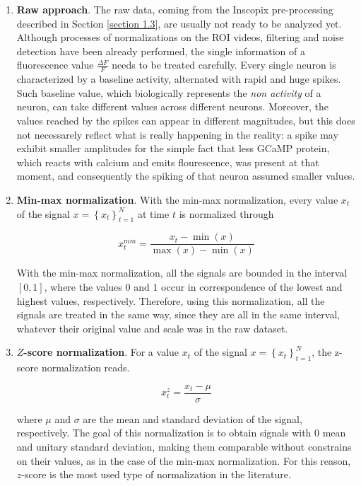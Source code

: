 \documentclass[12pt, a4paper]{report}
\begin{document}
\begin{enumerate}
	
	\item \textbf{Raw approach}. The raw data, coming from the Inscopix pre-processing described in Section \ref{section 1.3}, are usually not ready to be analyzed yet. Although processes of normalizations on the ROI videos, filtering and noise detection  have been already performed, the single information of a fluorescence value $\frac{\Delta F}{F}$ needs to be treated carefully. Every single neuron is characterized by a baseline activity, alternated with rapid and huge spikes. Such baseline value, which biologically represents the \textit{non activity} of a neuron, can take different values across different neurons. Moreover, the values reached by the spikes can appear in different magnitudes, but this does not necessarely reflect  what is really happening in the reality: a spike may exhibit smaller amplitudes for the simple fact that less GCaMP protein, which reacts with calcium and emits flourescence, was present at that moment, and consequently the spiking of that neuron assumed smaller values. 
	
	\item \textbf{Min-max normalization}. With the min-max normalization, every value $x_t$ of the signal $ x = \left\{ x_t\right\}_{t=1}^N$ at time $t$ is normalized through
	
	\begin{equation}
	x_t^{mm} = \frac{x_t -  \min(x)}{\max(x) - \min(x)}
	\end{equation}
	
	With the min-max normalization, all the signals are bounded in the interval $[0,1]$, where the values $0$ and $1$ occur in correspondence of the lowest and  highest values, respectively. Therefore, using this normalization, all the signals are treated in the same way, since they are all in the same interval, whatever their original value and scale was in the raw dataset.
	
	\item \textbf{$Z$-score normalization}. For a value  $x_t$ of the signal $ x = \left\{ x_t\right\}_{t=1}^N$, the z-score normalization reads. 
	
	\begin{equation}
	x_t^{z} = \frac{x_t -  \mu}{\sigma}
	\end{equation}
	
	where $\mu$ and $\sigma$ are the mean and standard deviation of the signal, respectively. The goal of this normalization is to obtain signals with $0$  mean and unitary standard deviation, making them comparable without constrains on their values, as in the case of the min-max normalization. For this reason, $z$-score is the most used type of normalization in the literature.
	
	
\end{enumerate}
\end{document}
